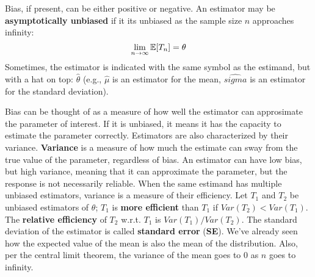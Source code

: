 Bias, if present, can be either positive or negative. An estimator may be \textbf{asymptotically unbiased} if it its unbiased as the sample size $n$ approaches infinity:
\begin{equation*}
    \lim_{n \to \infty} \mathbb{E}[T_n] = \theta
\end{equation*}
Sometimes, the estimator is indicated with the same symbol as the estimand, but with a hat on top: $\hat{\theta}$ (e.g., $\hat{\mu}$ is an estimator for the mean, $\hat{sigma}$ is an estimator for the standard deviation).

Bias can be thought of as a measure of how well the estimator can approsimate the parameter of interest. If it is unbiased, it means it has the capacity to estimate the parameter correctly. Estimators are also characterized by their variance. \textbf{Variance} is a measure of how much the estimate can sway from the true value of the parameter, regardless of bias. An estimator can have low bias, but high variance, meaning that it can approximate the parameter, but the response is not necessarily reliable. When the same estimand has multiple unbiased estimators, variance is a measure of their efficiency. Let $T_1$ and $T_2$ be unbiased estimators of $\theta$; $T_1$ is \textbf{more efficient} than $T_1$ if $Var(T_2) < Var(T_1)$. The \textbf{relative efficiency} of $T_2$ w.r.t. $T_1$ is $Var(T_1)/Var(T_2)$. The standard deviation of the estimator is called \textbf{standard error} (\textbf{SE}).
We've already seen how the expected value of the mean is also the mean of the distribution. Also, per the central limit theorem, the variance of the mean goes to 0 as $n$ goes to infinity.

